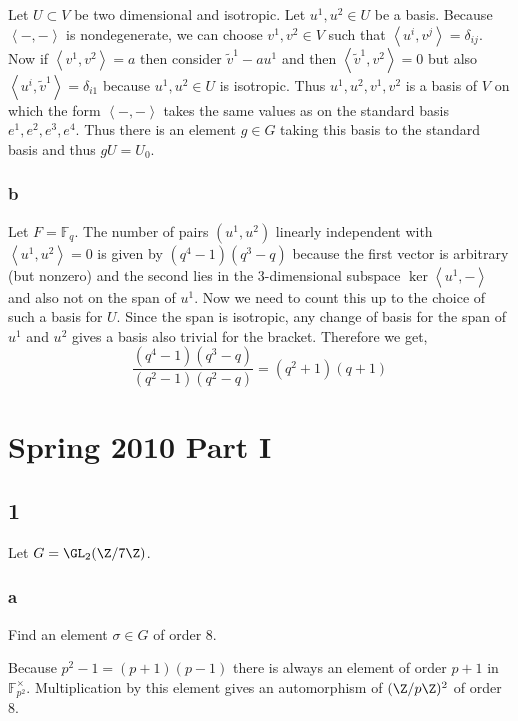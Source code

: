\documentclass[12pt]{article}
\newcommand{\inner}[2]{\left< #1, #2 \right>}
\renewcommand{\F}{\mathbb{F}}
\begin{document}
Let $U \subset V$ be two dimensional and isotropic. Let $u^1, u^2 \in U$ be a basis. Because $\inner{-}{-}$ is nondegenerate, we can choose $v^1, v^2 \in V$ such that $\inner{u^i}{v^j} = \delta_{ij}$. Now if $\inner{v^1}{v^2} = a$ then consider $\tilde{v}^1 - a u^1$ and then $\inner{\tilde{v}^1}{v^2} = 0$ but also $\inner{u^i}{\tilde{v}^1} = \delta_{i1}$ because $u^1,u^2 \in U$ is isotropic. Thus $u^1, u^2, v^1, v^2$ is a basis of $V$ on which the form $\inner{-}{-}$ takes the same values as on the standard basis $e^1, e^2, e^3, e^4$. Thus there is an element $g \in G$ taking this basis to the standard basis and thus $g U = U_0$.

\subsubsection{b}

Let $F = \F_q$. The number of pairs $(u^1, u^2)$ linearly independent with $\inner{u^1}{u^2} = 0$ is given by $(q^4 - 1)(q^3 - q)$ because the first vector is arbitrary (but nonzero) and the second lies in the $3$-dimensional subspace $\ker{\inner{u^1}{-}}$ and also not on the span of $u^1$. Now we need to count this up to the choice of such a basis for $U$. Since the span is isotropic, any change of basis for the span of $u^1$ and $u^2$ gives a basis also trivial for the bracket. Therefore we get,
\[ \frac{(q^4 - 1)(q^3 - q)}{(q^2 - 1)(q^2 - q)} = (q^2 + 1)(q + 1) \]

\section{Spring 2010 Part I}

\subsection{1}

Let $G = \GL_{2}(\Z/7\Z)$.

\subsubsection{a}

\begin{exercise}
Find an element $\sigma \in G$ of order $8$.
\end{exercise}

Because $p^2 -1 = (p + 1)(p-1)$ there is always an element of order $p + 1$ in $\mathbb{F}_{p^2}^\times$. Multiplication by this element gives an automorphism of $(\Z/p\Z)^2$ of order $8$.
\end{document}
